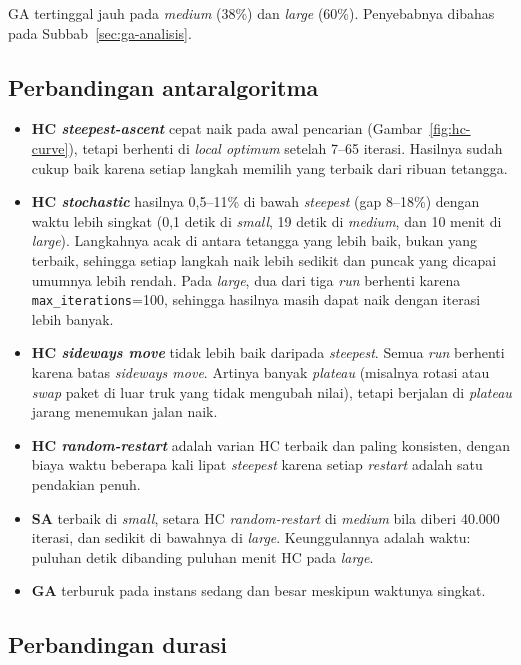 GA tertinggal jauh pada \textit{medium} (38\%) dan \textit{large} (60\%). Penyebabnya
dibahas pada Subbab~\ref{sec:ga-analisis}.

\subsection{Perbandingan antaralgoritma}

\begin{itemize}
	\item \textbf{HC \textit{steepest-ascent}} cepat naik pada awal pencarian
	(Gambar~\ref{fig:hc-curve}), tetapi berhenti di \textit{local optimum} setelah
	7--65 iterasi. Hasilnya sudah cukup baik karena setiap langkah memilih yang terbaik
	dari ribuan tetangga.
	\item \textbf{HC \textit{stochastic}} hasilnya 0,5--11\% di bawah \textit{steepest}
	(gap 8--18\%) dengan waktu lebih singkat (0,1 detik di \textit{small}, 19 detik di
	\textit{medium}, dan 10 menit di \textit{large}). Langkahnya acak di antara tetangga
	yang lebih baik, bukan yang terbaik, sehingga setiap langkah naik lebih sedikit dan
	puncak yang dicapai umumnya lebih rendah. Pada \textit{large}, dua dari tiga
	\textit{run} berhenti karena \texttt{max\_iterations}=100, sehingga hasilnya masih
	dapat naik dengan iterasi lebih banyak.
	\item \textbf{HC \textit{sideways move}} tidak lebih baik daripada \textit{steepest}.
	Semua \textit{run} berhenti karena batas \textit{sideways move}. Artinya banyak
	\textit{plateau} (misalnya rotasi atau \textit{swap} paket di luar truk yang tidak
	mengubah nilai), tetapi berjalan di \textit{plateau} jarang menemukan jalan naik.
	\item \textbf{HC \textit{random-restart}} adalah varian HC terbaik dan paling konsisten,
	dengan biaya waktu beberapa kali lipat \textit{steepest} karena setiap
	\textit{restart} adalah satu pendakian penuh.
	\item \textbf{SA} terbaik di \textit{small}, setara HC \textit{random-restart} di
	\textit{medium} bila diberi 40.000 iterasi, dan sedikit di bawahnya di \textit{large}.
	Keunggulannya adalah waktu: puluhan detik dibanding puluhan menit HC pada \textit{large}.
	\item \textbf{GA} terburuk pada instans sedang dan besar meskipun waktunya singkat.
\end{itemize}

\subsection{Perbandingan durasi}

